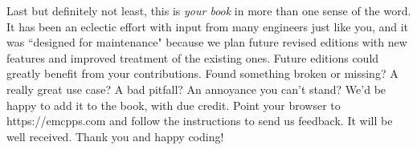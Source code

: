 Last but definitely not least, this is \emph{your book} in more than one sense of the word. It has been an eclectic effort with input from many engineers just like you, and it was ``designed for maintenance" because we plan future revised editions with new features and improved treatment of the existing ones. Future editions could greatly benefit from your contributions. Found something broken or missing? A really great use case? A bad pitfall? An annoyance you can't stand? We'd be happy to add it to the book, with due credit. Point your browser to https://emcpps.com and follow the instructions to send us feedback. It will be well received. Thank you and happy coding!





